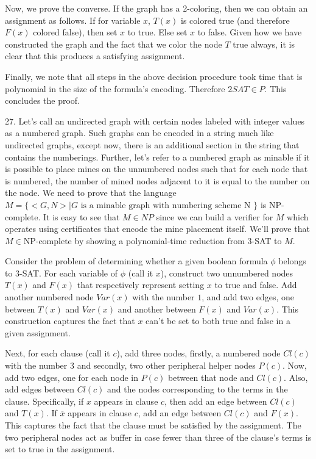 \documentclass{article}
\begin{document}
Now, we prove the converse. If the graph has a 2-coloring, then we can obtain an assignment as follows. If for variable $x$, $T(x)$ is colored true (and therefore $F(x)$ colored false), then set $x$ to true. Else set $x$ to false. Given how we have constructed the graph and the fact that we color the node $T$ true always, it is clear that this produces a satisfying assignment.

Finally, we note that all steps in the above decision procedure took time that is polynomial in the size of the formula's encoding. Therefore $2SAT \in P$. This concludes the proof.

27. Let's call an undirected graph with certain nodes labeled with integer values as a numbered graph. Such graphs can be encoded in a string much like undirected graphs, except now, there is an additional section in the string that contains the numberings. Further, let's refer to a numbered graph as minable if it is possible to place mines on the unnumbered nodes such that for each node that is numbered, the number of mined nodes adjacent to it is equal to the number on the node. We need to prove that the language $M = \{<G, N> \mid G \text{ is a minable graph with numbering scheme N }\}$ is NP-complete. It is easy to see that $M \in NP$ since we can build a verifier for $M$ which operates using certificates that encode the mine placement itself. We'll prove that $M \in \text{NP-complete}$ by showing a polynomial-time reduction from 3-SAT to $M$.

Consider the problem of determining whether a given boolean formula $\phi$ belongs to 3-SAT. For each variable of $\phi$ (call it $x$), construct two unnumbered nodes $T(x)$ and $F(x)$ that respectively represent setting $x$ to true and false. Add another numbered node $Var(x)$ with the number $1$, and add two edges, one between $T(x)$ and $Var(x)$ and another between $F(x)$ and $Var(x)$. This construction captures the fact that $x$ can't be set to both true and false in a given assignment.

Next, for each clause (call it $c$), add three nodes, firstly, a numbered node $Cl(c)$ with the number $3$ and secondly, two other peripheral helper nodes $P(c)$. Now, add two edges, one for each node in $P(c)$ between that node and $Cl(c)$. Also, add edges between $Cl(c)$ and the nodes corresponding to the terms in the clause. Specifically, if $x$ appears in clause $c$, then add an edge between $Cl(c)$ and $T(x)$. If $\overline{x}$ appears in clause $c$, add an edge between $Cl(c)$ and $F(x)$. This captures the fact that the clause must be satisfied by the assignment. The two peripheral nodes act as buffer in case fewer than three of the clause's terms is set to true in the assignment.
\end{document}
